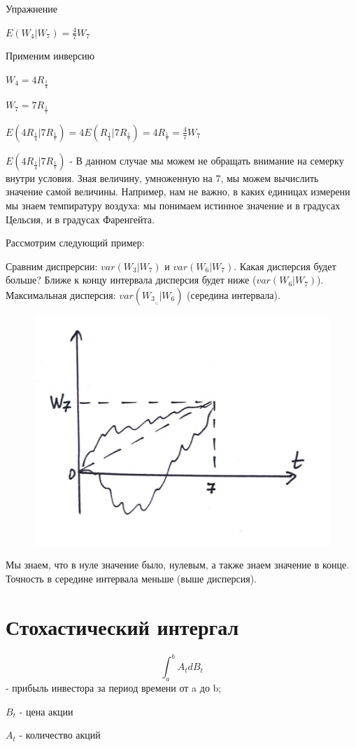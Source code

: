 \documentclass{article}
\begin{document}
Упражнение

$E(W_4|W_7)=\frac{4}{7}W_7$

Применим инверсию

$W_4=4R_\frac{1}{4}$

$W_7=7R_\frac{1}{7}$

$E(4R_\frac{1}{4}|7R_\frac{1}{7})=4E(R_\frac{1}{4}|7R_\frac{1}{7})=4R_\frac{1}{7}=\frac{4}{7}W_7$

$E(4R_\frac{1}{4}|7R_\frac{1}{7})$ - В данном случае мы можем не обращать внимание на семерку внутри условия. Зная величину, умноженную на 7, мы можем вычислить значение самой величины. Например, нам не важно, в каких единицах измерени мы знаем темпиратуру воздуха: мы понимаем истинное значение и в градусах Цельсия, и в градусах Фаренгейта.

\parindent=2cm

Рассмотрим следующий пример:

\parindent=2cm

Сравним диспрерсии: $var(W_3|W_7)$ и $var(W_6|W_7)$.
Какая дисперсия будет больше?
Ближе к концу интервала дисперсия будет ниже ($var(W_6|W_7)$).
Максимальная дисперсия: $var(W_3_,_5|W_6)$ (середина интервала).

\begin{figure}[h!]
\includegraphics[width=0.5\linewidth]{04_lecture1}
\end{figure}

Мы знаем, что в нуле значение было, нулевым, а также знаем значение в конце. Точность в середине интервала меньше (выше дисперсия).

\section*{Стохастический интергал}

$$\int_{a}^{b} A_t dB_t$$ - прибыль инвестора за период времени от a до b;

$B_t$ - цена акции

$A_t$ - количество акций
\end{document}
